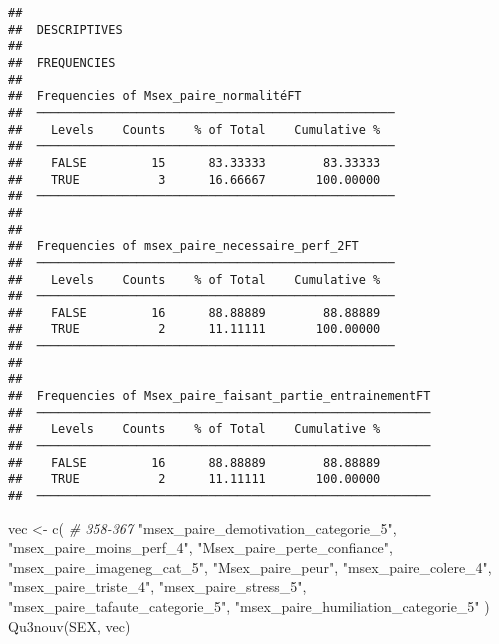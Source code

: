 \documentclass[
]{article}
\newenvironment{Shaded}{\begin{snugshade}}{\end{snugshade}}
\newcommand{\CommentTok}[1]{\textcolor[rgb]{0.56,0.35,0.01}{\textit{#1}}}
\newcommand{\FunctionTok}[1]{\textcolor[rgb]{0.00,0.00,0.00}{#1}}
\newcommand{\NormalTok}[1]{#1}
\newcommand{\OtherTok}[1]{\textcolor[rgb]{0.56,0.35,0.01}{#1}}
\newcommand{\StringTok}[1]{\textcolor[rgb]{0.31,0.60,0.02}{#1}}
\begin{document}
\begin{verbatim}
## 
##  DESCRIPTIVES
## 
##  FREQUENCIES
## 
##  Frequencies of Msex_paire_normalitéFT              
##  ────────────────────────────────────────────────── 
##    Levels    Counts    % of Total    Cumulative %   
##  ────────────────────────────────────────────────── 
##    FALSE         15      83.33333        83.33333   
##    TRUE           3      16.66667       100.00000   
##  ────────────────────────────────────────────────── 
## 
## 
##  Frequencies of msex_paire_necessaire_perf_2FT      
##  ────────────────────────────────────────────────── 
##    Levels    Counts    % of Total    Cumulative %   
##  ────────────────────────────────────────────────── 
##    FALSE         16      88.88889        88.88889   
##    TRUE           2      11.11111       100.00000   
##  ────────────────────────────────────────────────── 
## 
## 
##  Frequencies of Msex_paire_faisant_partie_entrainementFT 
##  ─────────────────────────────────────────────────────── 
##    Levels    Counts    % of Total    Cumulative %   
##  ─────────────────────────────────────────────────────── 
##    FALSE         16      88.88889        88.88889   
##    TRUE           2      11.11111       100.00000   
##  ───────────────────────────────────────────────────────
\end{verbatim}

\begin{Shaded}
\begin{Highlighting}[]
\NormalTok{vec }\OtherTok{\textless{}{-}} \FunctionTok{c}\NormalTok{(   }\CommentTok{\# 358{-}367}
  \StringTok{"msex\_paire\_demotivation\_categorie\_5"}\NormalTok{,}
  \StringTok{"msex\_paire\_moins\_perf\_4"}\NormalTok{,}
  \StringTok{"Msex\_paire\_perte\_confiance"}\NormalTok{,}
  \StringTok{"msex\_paire\_imageneg\_cat\_5"}\NormalTok{,}
  \StringTok{"Msex\_paire\_peur"}\NormalTok{,}
  \StringTok{"msex\_paire\_colere\_4"}\NormalTok{,}
  \StringTok{"msex\_paire\_triste\_4"}\NormalTok{,}
  \StringTok{"msex\_paire\_stress\_5"}\NormalTok{,}
  \StringTok{"msex\_paire\_tafaute\_categorie\_5"}\NormalTok{,}
  \StringTok{"msex\_paire\_humiliation\_categorie\_5"}
\NormalTok{  )}
\FunctionTok{Qu3nouv}\NormalTok{(SEX, vec)}
\end{Highlighting}
\end{Shaded}
\end{document}
